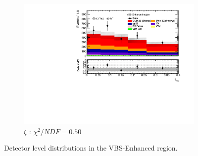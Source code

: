 \begin{figure}[!htb]
\begin{subfigure}{.49\textwidth}
        \includegraphics[width=.98\linewidth]{figures/Results/RecoDist_VBSEnhanced/reco_centrality_SR.pdf}
        \caption{ \footnotesize{$\zeta$ }: $\chi^2/NDF = 0.50$ }
    \end{subfigure}
    \caption{Detector level distributions in the VBS-Enhanced region.}  \label{fig:reco_VBS_Enhanced_b}
\end{figure}